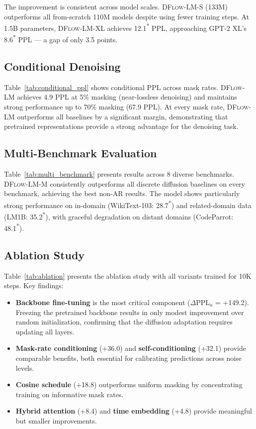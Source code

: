 \documentclass{article}
\newcommand{\tbd}[1]{#1\textsuperscript{*}}
\newcommand{\ours}{\textsc{DFlow-LM}}
\begin{document}
The improvement is consistent across model scales.
\ours{}-S (133M) outperforms all from-scratch 110M models despite using fewer training steps.
At 1.5B parameters, \ours{}-XL achieves \tbd{12.1} PPL, approaching GPT-2 XL's \tbd{8.6} PPL --- a gap of only 3.5 points.

\subsection{Conditional Denoising}
\label{sec:results:conditional}

Table~\ref{tab:conditional_ppl} shows conditional PPL across mask rates.
\ours{} achieves 4.9 PPL at 5\% masking (near-lossless denoising) and maintains strong performance up to 70\% masking (67.9 PPL).
At every mask rate, \ours{} outperforms all baselines by a significant margin, demonstrating that pretrained representations provide a strong advantage for the denoising task.

\subsection{Multi-Benchmark Evaluation}
\label{sec:results:multi}

Table~\ref{tab:multi_benchmark} presents results across 8 diverse benchmarks.
\ours{}-M consistently outperforms all discrete diffusion baselines on every benchmark, achieving the best non-AR results.
The model shows particularly strong performance on in-domain (WikiText-103: \tbd{28.7}) and related-domain data (LM1B: \tbd{35.2}), with graceful degradation on distant domains (CodeParrot: \tbd{48.1}).

\subsection{Ablation Study}
\label{sec:results:ablation}

Table~\ref{tab:ablation} presents the ablation study with all variants trained for 10K steps.
Key findings:

\begin{itemize}
    \item \textbf{Backbone fine-tuning} is the most critical component ($\Delta$PPL$_u$ = +149.2). Freezing the pretrained backbone results in only modest improvement over random initialization, confirming that the diffusion adaptation requires updating all layers.
    \item \textbf{Mask-rate conditioning} (+36.0) and \textbf{self-conditioning} (+32.1) provide comparable benefits, both essential for calibrating predictions across noise levels.
    \item \textbf{Cosine schedule} (+18.8) outperforms uniform masking by concentrating training on informative mask rates.
    \item \textbf{Hybrid attention} (+8.4) and \textbf{time embedding} (+4.8) provide meaningful but smaller improvements.
\end{itemize}
\end{document}
